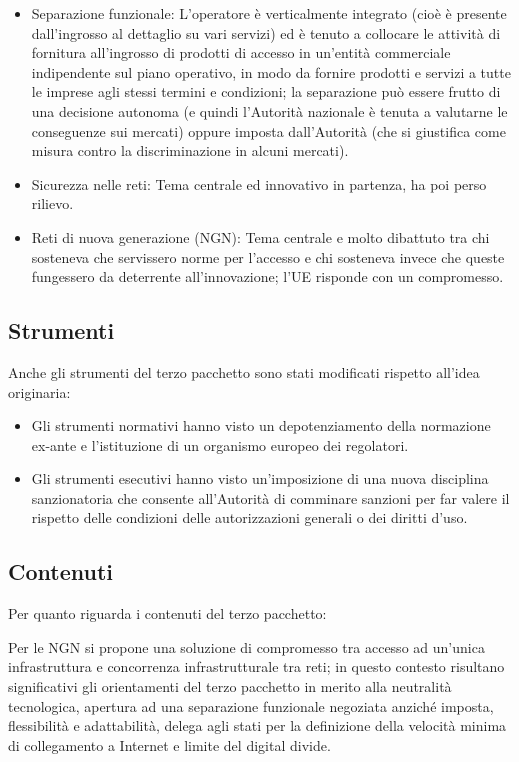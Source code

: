 \begin{itemize}
    \item Separazione funzionale: L’operatore è verticalmente integrato (cioè è presente dall’ingrosso al dettaglio su vari servizi) ed è tenuto a collocare le attività di fornitura all’ingrosso di prodotti di accesso in un’entità commerciale indipendente sul piano operativo, in modo da fornire prodotti e servizi a tutte le imprese agli stessi termini e condizioni; la separazione può essere frutto di una decisione autonoma (e quindi l’Autorità nazionale è tenuta a valutarne le conseguenze sui mercati) oppure imposta dall’Autorità (che si giustifica come misura contro la discriminazione in alcuni mercati).
    \item Sicurezza nelle reti: Tema centrale ed innovativo in partenza, ha poi perso rilievo.
    \item Reti di nuova generazione (NGN): Tema centrale e molto dibattuto tra chi sosteneva che servissero norme per l’accesso e chi sosteneva invece che queste fungessero da deterrente all’innovazione; l’UE risponde con un compromesso.
\end{itemize}

\subsection{Strumenti}
Anche gli strumenti del terzo pacchetto sono stati modificati rispetto all'idea originaria:
\begin{itemize}
    \item Gli strumenti normativi hanno visto un depotenziamento della normazione ex-ante e l'istituzione di un organismo europeo dei regolatori.
    \item Gli strumenti esecutivi hanno visto un’imposizione di una nuova disciplina sanzionatoria che consente all’Autorità di comminare sanzioni per far valere il rispetto delle condizioni delle autorizzazioni generali o dei diritti d’uso.    
\end{itemize}

\subsection{Contenuti}
Per quanto riguarda i contenuti del terzo pacchetto:\newline

Per le NGN si propone una soluzione di compromesso tra accesso ad un’unica infrastruttura e concorrenza infrastrutturale tra reti; in questo contesto risultano significativi gli orientamenti del terzo pacchetto in merito alla neutralità tecnologica, apertura ad una separazione funzionale negoziata anziché imposta, flessibilità e adattabilità, delega agli stati per la definizione della velocità minima di collegamento a Internet e limite del digital divide.\newline

